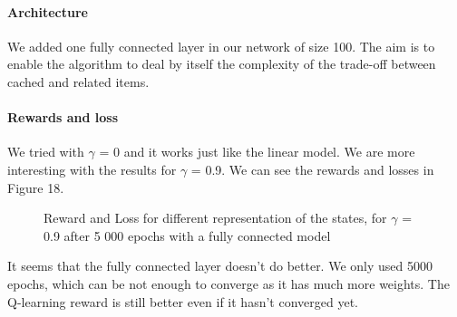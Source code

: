 \documentclass[a4paper]{article}
\begin{document}
            \paragraph{Architecture} We added one fully connected layer in our network of size 100. The aim is to enable the algorithm to deal by itself the complexity of the trade-off between cached and related items. 
    
        \paragraph{Rewards and loss} We tried with $\gamma$ = 0 and it works just like the linear model. We are more interesting with the results for $\gamma $ = 0.9. We can see the rewards and losses in Figure 18. 
        
        \begin{figure}[h!]
        \centering
        \qquad
        \caption{Reward and Loss for different representation of the states, for $\gamma$ = 0.9 after 5 000 epochs with a fully connected model}%
        \label{fig:example}%
        \end{figure}
    
        It seems that the fully connected layer doesn't do better. We only used 5000 epochs, which can be not enough to converge as it has much more weights. The Q-learning reward is still better even if it hasn't converged yet.
\end{document}
